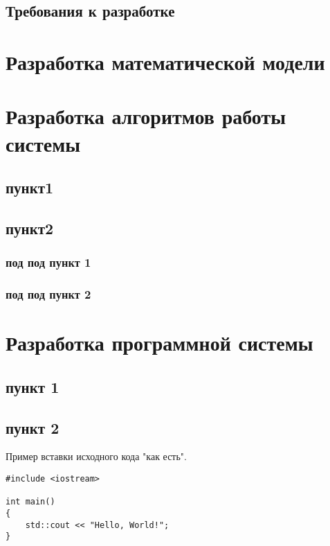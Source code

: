 \subsection{Требования к разработке}
\lipsum[38]
\clearpage



\section{Разработка математической модели}
\lipsum[40]
\clearpage



\section{Разработка алгоритмов работы системы}
\subsection{пункт1}
\lipsum[9]

\subsection{пункт2}
\lipsum[10]

\subsubsection{под под пункт 1}
\lipsum[11]

\subsubsection{под под пункт 2}
\lipsum[12]
\clearpage



\clearpage
\section{Разработка программной системы}
\subsection{пункт 1}
\lipsum[52]

\subsection{пункт 2}
Пример вставки исходного кода "как есть".
{\verbatimFont
\begin{verbatim}
#include <iostream>

int main()
{
    std::cout << "Hello, World!";
}
\end{verbatim}}

